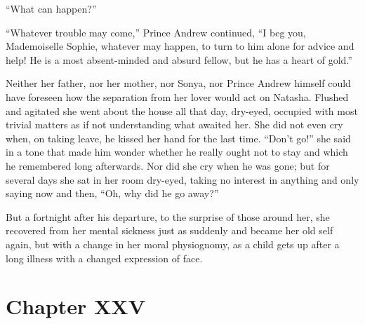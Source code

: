 ``What can happen?''

``Whatever trouble may come,'' Prince Andrew continued, ``I beg
you, Mademoiselle Sophie, whatever may happen, to turn to him
alone for advice and help! He is a most absent-minded and absurd
fellow, but he has a heart of gold.''

Neither her father, nor her mother, nor Sonya, nor Prince Andrew
himself could have foreseen how the separation from her lover
would act on Natasha. Flushed and agitated she went about the
house all that day, dry-eyed, occupied with most trivial matters
as if not understanding what awaited her. She did not even cry
when, on taking leave, he kissed her hand for the last
time. ``Don't go!'' she said in a tone that made him wonder
whether he really ought not to stay and which he remembered long
afterwards. Nor did she cry when he was gone; but for several
days she sat in her room dry-eyed, taking no interest in anything
and only saying now and then, ``Oh, why did he go away?''

But a fortnight after his departure, to the surprise of those
around her, she recovered from her mental sickness just as
suddenly and became her old self again, but with a change in her
moral physiognomy, as a child gets up after a long illness with a
changed expression of face.


\chapter*{Chapter XXV}
\ifaudio
{} 
\fi


